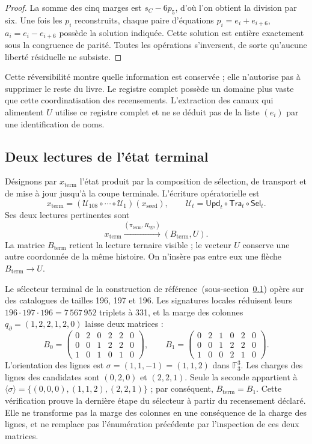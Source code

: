 \begin{proof}
La somme des cinq marges est \(s_C-6p_5\), d'où l'on obtient la
division par six. Une fois les \(p_i\) reconstruits, chaque paire d'équations
\(p_i=e_i+e_{i+6}\), \(a_i=e_i-e_{i+6}\) possède la solution indiquée.
Cette solution est entière exactement sous la congruence de parité. Toutes
les opérations s'inversent, de sorte qu'aucune liberté résiduelle ne subsiste.
\end{proof}

Cette réversibilité montre quelle information est conservée ; elle n'autorise pas à
supprimer le reste du livre. Le registre complet possède un domaine plus vaste
que cette coordinatisation des recensements. L'extraction des canaux qui alimentent
\(U\) utilise ce registre complet et ne se déduit pas de la liste
\((e_i)\) par une identification de noms.



\subsection{Deux lectures de l'état terminal}
\label{subsec:k-terminal}

Désignons par \(x_{\mathrm{term}}\) l'état produit par la composition de sélection, de transport et de mise à jour jusqu'à la coupe terminale. L'écriture opératorielle est
\[
 x_{\mathrm{term}}=
 (\mathcal U_{108}\circ\cdots\circ\mathcal U_1)(x_{\mathrm{seed}}),
 \qquad \mathcal U_t=\mathsf{Upd}_t\circ\mathsf{Tra}_t\circ\mathsf{Sel}_t.
\]
Ses deux lectures pertinentes sont
\[
 x_{\mathrm{term}}
 \xrightarrow{(\pi_{\mathrm{term}},R_{\mathrm{sgn}})}
 (B_{\mathrm{term}},U).
\]
La matrice \(B_{\mathrm{term}}\) retient la lecture ternaire visible ; le vecteur \(U\) conserve une autre coordonnée de la même histoire. On n'insère pas entre eux une flèche \(B_{\mathrm{term}}\to U\).

Le sélecteur terminal de la construction de référence~(sous-section~\ref{subsec:k-terminal}) opère sur des catalogues
de tailles 196, 197 et 196. Les signatures locales réduisent leurs
\(196\cdot197\cdot196=7\,567\,952\) triplets à 331, et la marge des
colonnes \(q_{\partial}=(1,2,2,1,2,0)\) laisse deux matrices :
\[
 B_0=\begin{pmatrix}0&2&0&2&2&0\\0&0&1&2&2&0\\1&0&1&0&1&0\end{pmatrix},
 \qquad
 B_1=\begin{pmatrix}0&2&1&0&2&0\\0&0&1&2&2&0\\1&0&0&2&1&0\end{pmatrix}.
\]
L'orientation des lignes est \(\sigma=(1,1,-1)=(1,1,2)\) dans
\(\mathbb F_3^3\). Les charges des lignes des candidates sont
\((0,2,0)\) et \((2,2,1)\). Seule la seconde appartient à
\(\langle\sigma\rangle=\{(0,0,0),(1,1,2),(2,2,1)\}\) ; par conséquent,
\(B_{\mathrm{term}}=B_1\). Cette vérification prouve la dernière étape du
sélecteur à partir du recensement déclaré. Elle ne transforme pas la marge des colonnes
en une conséquence de la charge des lignes, et ne remplace pas l'énumération
précédente par l'inspection de ces deux matrices.

